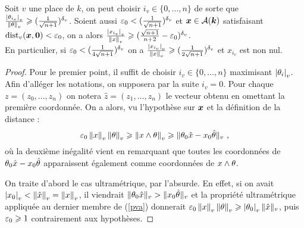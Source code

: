 \begin{lem} \label{pv}
  Soit $v$ une place de $k$, on peut choisir $i_v \in \{ 0, \dots, n\}$ de
  sorte que $\frac{\left\lvert\theta_{i_v}\right\rvert_{v}}{\left\lVert\theta\right\rVert_{v}} \geqslant (\frac{1}{\sqrt{n+1}})^{\delta_v}
  $.  Soient aussi $\varepsilon_0 < (\frac{1}{\sqrt{n+1}})^{\delta_v}$ et ${\boldsymbol{x}} \in
  \mathcal{A}(\boldsymbol{k})$ satisfaisant $\mathrm{dist}_v({\boldsymbol{x}}, {\boldsymbol{0}}) < \varepsilon_0$, on a alors
  $\frac{\left\lvert x_{i_v}\right\rvert_{v}}{\left\lVert x\right\rVert_{v}} \geqslant (\frac{\sqrt{n+1}}{n+2}-\varepsilon_0)^{\delta_v}$. \\ En
  particulier, si $\varepsilon_0 < (\frac{1}{4\sqrt{n+1}})^{\delta_v}$ on a
  $\frac{\left\lvert x_{i_v}\right\rvert_{v}}{\left\lVert x\right\rVert_{v}} \geqslant (\frac{1}{2\sqrt{n+1}})^{\delta_v}$ et $x_{i_v}$
  est non nul.
\end{lem}

\begin{proof}
  Pour le premier point, il suffit de choisir $i_v \in \{ 0, \dots, n\}$
  maximisant $\left\lvert\theta_i\right\rvert_{v}$. Afin d'alléger les notations, on supposera par la
  suite $i_v = 0$. Pour chaque $z = (z_0, \dots, z_n)$ on notera $\hat{z} =
  (z_1, \dots, z_n)$ le vecteur obtenu en omettant la première coordonnée. On
  a alors, vu l'hypothèse sur ${\boldsymbol{x}}$ et la définition de la distance :
  \begin{equation}
  \varepsilon_0 \left\lVert x\right\rVert_{v}\left\lVert\theta\right\rVert_{v}  \geqslant \left\lVert x \wedge \theta\right\rVert_{v} \geqslant \|\theta_0 \hat{x} -
    x_0 \hat{\theta}\|_{v} \text{ ,} \label{pva}
  \end{equation}
  où la deuxième inégalité vient en remarquant que toutes les coordonnées de
  $\theta_0 \hat{x} - x_0 \hat{\theta}$ apparaissent également comme coordonnées
  de $x \wedge \theta$.

  On traite d'abord le cas ultramétrique, par l'absurde. En effet, si on avait
  $\left\lvert x_0\right\rvert_{v}< \left\lVert\hat{x}\right\rVert_{v} = \left\lVert x\right\rVert_{v}$, il viendrait $\|\theta_0 \hat{x}\|_{v} >
  \|x_0 \hat{\theta}\|_{v}$ et la propriété ultramétrique appliquée au dernier
  membre de (\ref{pva}) donnerait $\varepsilon_0 \left\lVert x\right\rVert_{v}\left\lVert\theta\right\rVert_{v}  \geqslant
  \left\lvert\theta_0\right\rvert_{v}\|\hat{x}\|_{v}$, puis $\varepsilon_0 \geqslant 1$ contrairement aux hypothèses.


\end{proof}
